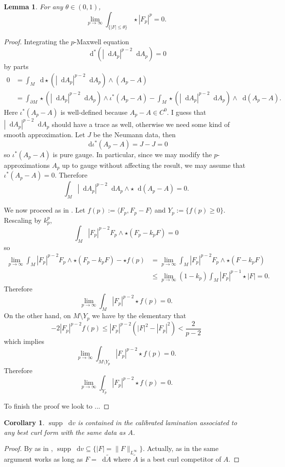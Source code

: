 \documentclass[reqno,11pt]{amsart}
\newcommand*\dif{\mathop{}\!\mathrm{d}}
\DeclareMathOperator{\supp}{supp}
\newtheorem{lemma}[theorem]{Lemma}
\newtheorem{corollary}[theorem]{Corollary}
\theoremstyle{definition}
\numberwithin{equation}{section}
\begin{document}
\begin{lemma}
For any $\theta \in (0, 1)$,
	$$\lim_{p \to \infty} \int_{\{|F| \leq \theta\}} \star |F_p|^p = 0.$$
\end{lemma}
\begin{proof}
Integrating the $p$-Maxwell equation 
$$\dif^*(|\dif A_p|^{p - 2} \dif A_p) = 0$$
by parts 
\begin{align*}
	0 &= \int_M \dif \star (|\dif A_p|^{p - 2} \dif A_p) \wedge (A_p - A) \\
	&= \int_{\partial M} \star(|\dif A_p|^{p - 2} \dif A_p) \wedge \iota^* (A_p - A) - \int_M \star (|\dif A_p|^{p - 2} \dif A_p) \wedge \dif (A_p - A).
\end{align*}
Here $\iota^* (A_p - A)$ is well-defined because $A_p - A \in C^0$.
I guess that $|\dif A_p|^{p - 2} \dif A_p$ should have a trace as well, otherwise we need some kind of smooth approximation.
Let $J$ be the Neumann data, then 
$$\dif \iota^*(A_p - A) = J - J = 0$$
so $\iota^*(A_p - A)$ is pure gauge. In particular, since we may modify the $p$-approximations $A_p$ up to gauge without affecting the result, we may assume that $\iota^*(A_p - A) = 0$.
Therefore 
$$\int_M |\dif A_p|^{p - 2} \dif A_p \wedge \star \dif (A_p - A) = 0.$$

We now proceed as in \cite[Lemma 6.3]{daskalopoulos2020transverse}.
Let $f(p) := \langle F_p, F_p - F\rangle$ and $Y_p := \{f(p) \geq 0\}$.
Rescaling by $k_p^p$, 
$$\int_M |F_p|^{p - 2} F_p \wedge \star (F_p - k_p F) = 0$$
so 
\begin{align*}
	\lim_{p \to \infty} \int_M |F_p|^{p - 2} F_p \wedge \star (F_p - k_p F) - \star f(p) 
	&= \lim_{p \to \infty} \int_M |F_p|^{p - 2} F_p \wedge \star (F - k_p F) \\
	&\leq \lim_{p \to \infty} (1 - k_p) \int_M |F_p|^{p - 1} \star |F| = 0.
\end{align*}
Therefore 
$$\lim_{p \to \infty} \int_M |F_p|^{p - 2} \star f(p) = 0.$$
On the other hand, on $M \setminus Y_p$ we have by the elementary \cite[Lemma 6.2]{daskalopoulos2020transverse} that 
$$
	-2|F_p|^{p - 2} f(p) \leq |F_p|^{p - 2} (|F|^2 - |F_p|^2) < \frac{2}{p - 2}
$$
which implies 
$$\lim_{p \to \infty} \int_{M \setminus Y_p} |F_p|^{p - 2} \star f(p) = 0.$$
Therefore 
$$\lim_{p \to \infty} \int_{Y_p} |F_p|^{p - 2} \star f(p) = 0.$$

To finish the proof we look to \cite[Proposition 6.5]{daskalopoulos2020transverse}...
\end{proof}

\begin{corollary}
$\supp \dif v$ is contained in the calibrated lamination associated to any best curl form with the same data as $A$.
\end{corollary}
\begin{proof}
By as in \cite[Theorem 6.1]{daskalopoulos2020transverse}, $\supp \dif v \subseteq \{|F| = \|F\|_{L^\infty}\}$.
Actually, as in \cite[Corollary 6.8]{daskalopoulos2020transverse} the same argument works as long as $F = \dif \tilde A$ where $\tilde A$ is a best curl competitor of $A$.
\end{proof}
\end{document}
